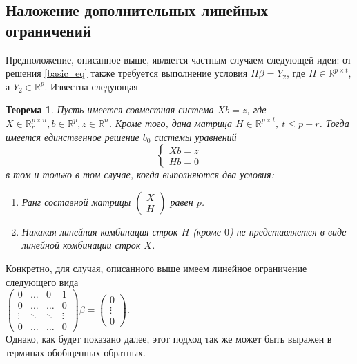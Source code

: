 \documentclass{spisok-article}
\newtheorem*{mytheor*}{Теорема}
\theoremstyle{definition}
\begin{document}
\subsection{Наложение дополнительных линейных ограничений}
Предположение, описанное выше, является частным случаем следующей идеи: от решения \eqref{basic_eq} также требуется выполнение условия $H\beta=Y_2$, где $H \in \mathbb{R}^{p \times t}$, а $Y_2 \in \mathbb{R}^p$. Известна следующая
\begin{mytheor*}\cite{sheffe}
Пусть имеется совместная система $Xb=z$, где $X \in \mathbb{R}_r^{p \times n}, b \in \mathbb{R}^p, z \in \mathbb{R}^n$. Кроме того, дана матрица $H \in \mathbb{R}^{p \times t},\ t \leq p-r$. Тогда имеется единственное решение $b_0$ системы уравнений 
\[
\begin{cases}
Xb=z\\
Hb=0
\end{cases} 
\] 
в том и только в том случае, когда выполняются два условия:
\begin{enumerate}
\item Ранг составной матрицы 
$\begin{pmatrix}
X\\
H
\end{pmatrix}$
равен $p$.
\item Никакая линейная комбинация строк $H$ (кроме $0$) не представляется в виде линейной комбинации строк $X$.
\end{enumerate}
\end{mytheor*} 
Конкретно, для случая, описанного выше имеем линейное ограничение следующего вида\\
$\begin{pmatrix}
0 & \dots & 0 & 1 \\
0 & \dots & \dots  & 0 \\
\vdots & \ddots & \ddots & \vdots \\
0 & \dots & \dots & 0
\end{pmatrix}\beta = \begin{pmatrix}
0 \\ \vdots \\ 0
\end{pmatrix}.$\\
Однако, как будет показано далее, этот подход так же может быть выражен в терминах обобщенных обратных.
\end{document}

